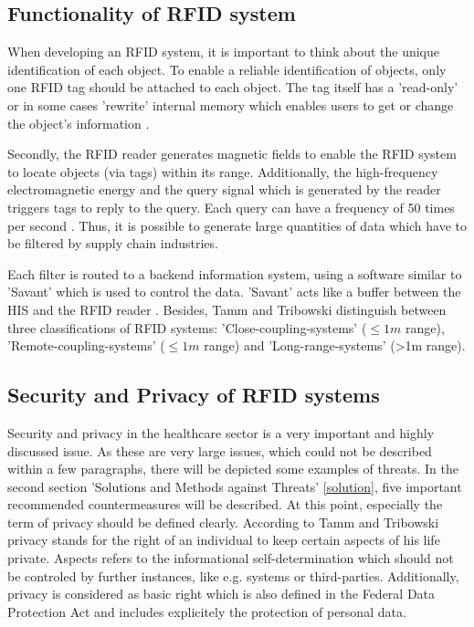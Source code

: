 \subsection{Functionality of RFID system} \label{chipless}

When developing an RFID system, it is important to think about the unique identification of each object. To enable a reliable identification of objects, only one RFID tag should be attached to each object. The tag itself has a 'read-only' or in some cases 'rewrite' internal memory which enables users to get or change the object's information \cite{ncbi}. 

Secondly, the RFID reader generates magnetic fields to enable the RFID system to locate objects (via tags) within its range. Additionally, the high-frequency electromagnetic energy and the query signal which is generated by the reader triggers tags to reply to the query. Each query can have a frequency of 50 times per second \cite{ncbi}. Thus, it is possible to generate large quantities of data which have to be filtered by supply chain industries. 

Each filter is routed to a backend information system, using a software similar to 'Savant' which is used to control the data. 'Savant' acts like a buffer between the HIS and the RFID reader \cite{ncbi}.
Besides, Tamm and Tribowski \cite[p.18 ff.]{fokus} distinguish between three classifications of RFID systems: 'Close-coupling-systems' ($\le1m$ range), 'Remote-coupling-systems' ($\le1m$ range) and 'Long-range-systems' (>1m range). 

\subsection{Security and Privacy of RFID systems} \label{secprivrfid}

Security and privacy in the healthcare sector is a very important and highly discussed issue. As these are very large issues, which could not be described within a few paragraphs, there will be depicted some examples of threats. In the second section 'Solutions and Methods against Threats' \ref{solution}, five important recommended countermeasures will be described. 
At this point, especially the term of privacy should be defined clearly. According to Tamm and Tribowski \cite[p.90 ff.]{fokus} privacy stands for the right of an individual to keep certain aspects of his life private. Aspects refers to the informational self-determination which should not be controled by further instances, like e.g. systems or third-parties. Additionally, privacy is considered as basic right which is also defined in the Federal Data Protection Act and includes explicitely the protection of personal data.

